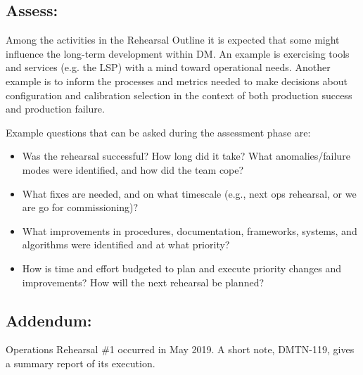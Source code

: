 \subsection{Assess:}

Among the activities in the Rehearsal Outline it is expected that some might influence the long-term development
within DM.  An example is exercising tools and services (e.g. the LSP) with a mind toward operational needs.  Another
example is to inform the processes and metrics needed to make decisions about configuration and calibration selection in the context of both production success and production failure.

Example questions that can be asked during the assessment phase are:
\begin{itemize}[topsep=-8pt]
\item Was the rehearsal successful? How long did it take? What anomalies/failure modes were identified, and how did the team cope? 
\item What fixes are needed, and on what timescale (e.g., next ops rehearsal, or we are go for commissioning)? 
\item What improvements in procedures, documentation, frameworks, systems, and algorithms were identified and at what priority?
\item How is time and effort budgeted to plan and execute priority changes and improvements? How will the next rehearsal be planned?
\end{itemize}

\subsection{Addendum:}
Operations Rehearsal \#1 occurred in May 2019.  A short note, DMTN-119, gives a summary 
report of its execution.

\clearpage

